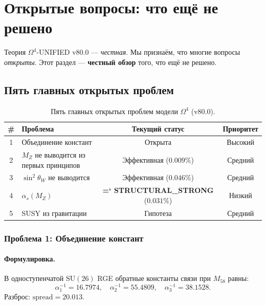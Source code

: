 \documentclass[11pt,a4paper]{article}
\newcommand{\SU}{\mathrm{SU}}
\newcommand{\Om}{\Omega^4}
\renewcommand{\texttt}[1]{{\ttfamily\hyphenchar\font=`\- #1}}
\theoremstyle{definition}
\begin{document}
\section{Открытые вопросы: что ещё не решено}
\label{sec:open}

Теория $\Om$-UNIFIED v80.0 — \emph{честная}. Мы признаём, что 
многие вопросы \emph{открыты}. Этот раздел — \textbf{честный 
обзор} того, что ещё не решено.

\subsection{Пять главных открытых проблем}
\label{subsec:five-open}

\begin{table}[htbp]
\centering
\caption{Пять главных открытых проблем модели $\Om$ (v80.0).}
\label{tab:five-open-problems}
\begin{tabular}{clcc}
\toprule
\# & Проблема & Текущий статус & Приоритет \\
\midrule
1 & Объединение констант & Открыта & Высокий \\
2 & $M_Z$ не выводится из первых принципов & 
    Эффективная ($0.009\%$) & Средний \\
3 & $\sin^2\theta_W$ не выводится & 
    Эффективная ($0.046\%$) & Средний \\
4 & $\alpha_s(M_Z)$ & 
    \textbf{\texttt{STRUCTURAL\_STRONG}} ($0.031\%$) & Низкий \\
5 & SUSY из гравитации & Гипотеза & Средний \\
\bottomrule
\end{tabular}
\end{table}
   
\subsubsection{Проблема 1: Объединение констант}

\paragraph{Формулировка.}
В одноступенчатой $\SU(26)$ RGE обратные константы связи при 
$M_{58}$ равны:
\begin{equation}
    \alpha_1^{-1} = 16.7974, \quad
    \alpha_2^{-1} = 55.4809, \quad
    \alpha_3^{-1} = 38.1528.
\end{equation}
Разброс: $\text{spread} = 20.013$.
\end{document}

